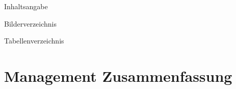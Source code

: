 \documentclass[12pt]{article}
\begin{document}
\begin{titlepage}
  
\end{titlepage}

\begin{LARGE} Inhaltsangabe \end{LARGE}

\tableofcontents
\setcounter{tocdepth}{2}

\newpage

\begin{LARGE} Bilderverzeichnis \end{LARGE}

\listoffigures 

\newpage

\begin{LARGE} Tabellenverzeichnis \end{LARGE}

\listoftables 

\newpage

 
\renewcommand{\labelenumi}{(\alph{enumi})}
\renewcommand{\labelenumii}{\arabic{enumii}.}

\fancyfoot[C]{--- \thepage/\pageref{LastPage}\ ---}

\section{Management Zusammenfassung}
\end{document}
